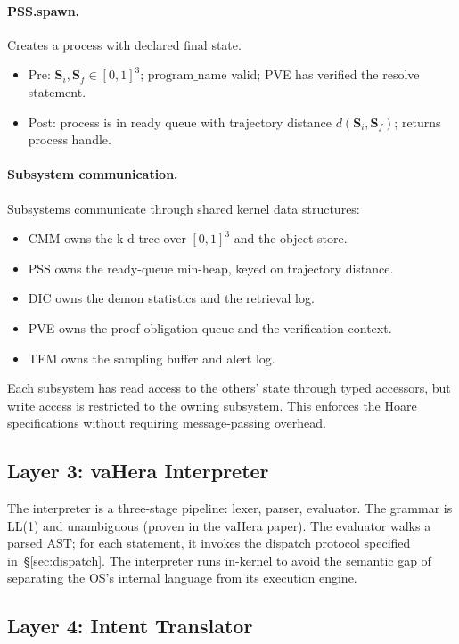 \documentclass[11pt,twocolumn,a4paper]{article}
\newcommand{\Scoord}{\mathbf{S}}
\begin{document}
\paragraph{PSS.spawn.} Creates a process with declared final state.
\begin{itemize}
\item Pre: $\Scoord_i, \Scoord_f \in [0,1]^3$; $\text{program\_name}$ valid; PVE has verified the resolve statement.
\item Post: process is in ready queue with trajectory distance $d(\Scoord_i, \Scoord_f)$; returns process handle.
\end{itemize}

\paragraph{Subsystem communication.} Subsystems communicate through shared kernel data structures:
\begin{itemize}[leftmargin=*]
\item CMM owns the k-d tree over $[0,1]^3$ and the object store.
\item PSS owns the ready-queue min-heap, keyed on trajectory distance.
\item DIC owns the demon statistics and the retrieval log.
\item PVE owns the proof obligation queue and the verification context.
\item TEM owns the sampling buffer and alert log.
\end{itemize}
Each subsystem has read access to the others' state through typed accessors, but write access is restricted to the owning subsystem. This enforces the Hoare specifications without requiring message-passing overhead.

\subsection{Layer 3: vaHera Interpreter}

The interpreter is a three-stage pipeline: lexer, parser, evaluator. The grammar is LL(1) and unambiguous (proven in the vaHera paper). The evaluator walks a parsed AST; for each statement, it invokes the dispatch protocol specified in~\S\ref{sec:dispatch}. The interpreter runs in-kernel to avoid the semantic gap of separating the OS's internal language from its execution engine.

\subsection{Layer 4: Intent Translator}
\end{document}
